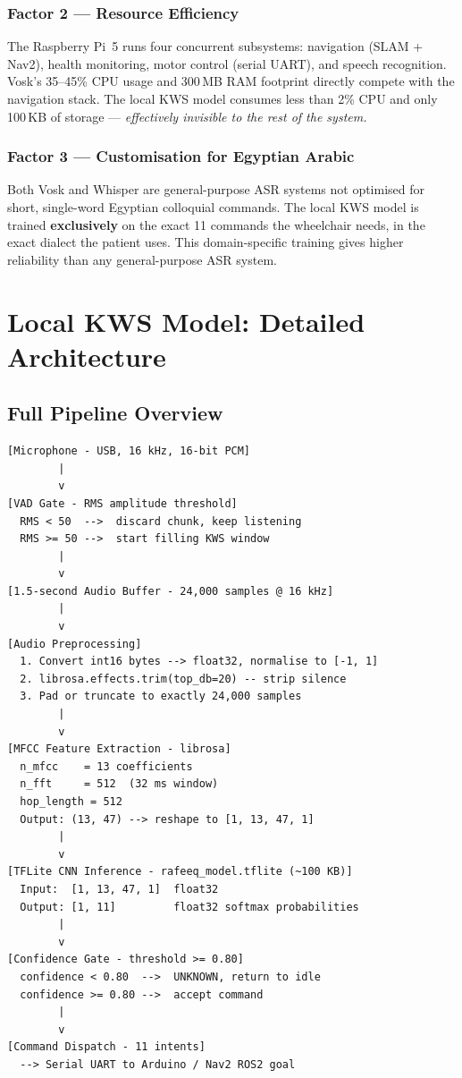 \documentclass[12pt, a4paper]{report}
\begin{document}
\subsection{Factor 2 --- Resource Efficiency}

The Raspberry Pi~5 runs four concurrent subsystems: navigation (SLAM + Nav2), health
monitoring, motor control (serial UART), and speech recognition. Vosk's 35--45\% CPU
usage and 300\,MB RAM footprint directly compete with the navigation stack. The local
KWS model consumes less than 2\% CPU and only 100\,KB of storage ---
\textit{effectively invisible to the rest of the system.}

\subsection{Factor 3 --- Customisation for Egyptian Arabic}

Both Vosk and Whisper are general-purpose ASR systems not optimised for short,
single-word Egyptian colloquial commands. The local KWS model is trained
\textbf{exclusively} on the exact 11 commands the wheelchair needs, in the exact
dialect the patient uses. This domain-specific training gives higher reliability than
any general-purpose ASR system.

\chapter{Local KWS Model: Detailed Architecture}

\section{Full Pipeline Overview}

\begin{lstlisting}[caption={Complete voice-to-command pipeline},
                   label={lst:pipeline}]
[Microphone - USB, 16 kHz, 16-bit PCM]
        |
        v
[VAD Gate - RMS amplitude threshold]
  RMS < 50  -->  discard chunk, keep listening
  RMS >= 50 -->  start filling KWS window
        |
        v
[1.5-second Audio Buffer - 24,000 samples @ 16 kHz]
        |
        v
[Audio Preprocessing]
  1. Convert int16 bytes --> float32, normalise to [-1, 1]
  2. librosa.effects.trim(top_db=20) -- strip silence
  3. Pad or truncate to exactly 24,000 samples
        |
        v
[MFCC Feature Extraction - librosa]
  n_mfcc    = 13 coefficients
  n_fft     = 512  (32 ms window)
  hop_length = 512
  Output: (13, 47) --> reshape to [1, 13, 47, 1]
        |
        v
[TFLite CNN Inference - rafeeq_model.tflite (~100 KB)]
  Input:  [1, 13, 47, 1]  float32
  Output: [1, 11]         float32 softmax probabilities
        |
        v
[Confidence Gate - threshold >= 0.80]
  confidence < 0.80  -->  UNKNOWN, return to idle
  confidence >= 0.80 -->  accept command
        |
        v
[Command Dispatch - 11 intents]
  --> Serial UART to Arduino / Nav2 ROS2 goal
\end{lstlisting}
\end{document}
